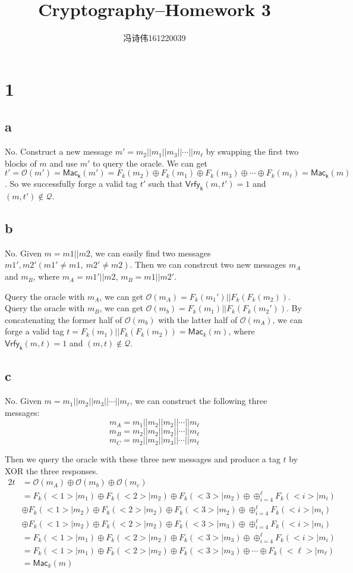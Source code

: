 \documentclass[a4papers]{ctexart}
\title{Cryptography--Homework 3}
\author{冯诗伟161220039}
\date{}
\newcommand{\mc}[1]{\mathcal{#1}}
\newcommand{\ms}[1]{\mathsf{#1}}
\begin{document}
\maketitle
\section*{1}
\subsection*{a}
No. Construct a new message $m'=m_2||m_1||m_3||\cdots||m_\ell$ by swapping the first two blocks of $m$ and use $m'$ to query the oracle.
We can get $t'=\mc{O}(m')=\ms{Mac_k}(m')=F_k(m_2)\oplus F_k(m_1)\oplus F_k(m_3)\oplus \cdots \oplus F_k(m_\ell)=\ms{Mac_k}(m)$.
So we successfully forge a valid tag $t'$ such that $\ms{Vrfy_k}(m,t')=1$ and $(m,t')\notin \mc{Q}$.

\subsection*{b}
No. Given $m=m1||m2$, we can easily find two messages $m1', m2'(m1'\ne m1,\ m2'\ne m2)$. Then we can constrcut two new messages $m_A$ and $m_B$, where
$m_A=m1'||m2$, $m_B=m1||m2'$. 

Query the oracle with $m_A$, we can get $\mc{O}(m_A)=F_k(m_1')||F_k(F_k(m_2))$.
Query the oracle with $m_B$, we can get $\mc{O}(m_b)=F_k(m_1)||F_k(F_k(m_2'))$.
By concatenating the former half of $\mc{O}(m_b)$ with the latter half of $\mc{O}(m_A)$, we can forge a valid tag $t=F_k(m_1)||F_k(F_k(m_2))=\ms{Mac}_k(m)$, where $\ms{Vrfy_k}(m,t)=1$ and $(m,t)\notin \mc{Q}$.

\subsection*{c}
No. Given $m=m_1||m_2||m_3||\cdots||m_\ell$, we can construct the following three messages:
\[m_A=m_1||m_2||m_2||\cdots||m_\ell\]
\[m_B=m_2||m_2||m_2||\cdots||m_\ell\]
\[m_C=m_2||m_2||m_3||\cdots||m_\ell\]

Then we query the oracle with these three new messages and produce a tag $t$ by 
XOR the three responses.
\begin{alignat*}{2}
    t &= \mc{O}(m_A)\oplus \mc{O}(m_b)\oplus \mc{O}(m_c)\\
    &= F_k(<1>|m_1)\oplus F_k(<2>|m_2)\oplus F_k(<3>|m_2)\oplus \oplus^{\ell}_{i=4} F_k(<i>|m_i)\\
    &\oplus  F_k(<1>|m_2)\oplus F_k(<2>|m_2)\oplus F_k(<3>|m_2)\oplus \oplus^{\ell}_{i=4} F_k(<i>|m_i)\\
    &\oplus  F_k(<1>|m_2)\oplus F_k(<2>|m_2)\oplus F_k(<3>|m_3)\oplus \oplus^{\ell}_{i=4} F_k(<i>|m_i)\\
    &= F_k(<1>|m_1)\oplus F_k(<2>|m_2)\oplus F_k(<3>|m_3)\oplus \oplus^{\ell}_{i=4} F_k(<i>|m_i)\\
    &= F_k(<1>|m_1)\oplus F_k(<2>|m_2)\oplus F_k(<3>|m_3)\oplus \cdots \oplus F_k(<\ell>|m_\ell)\\
    &= \ms{Mac}_k(m)
\end{alignat*}
\end{document}
